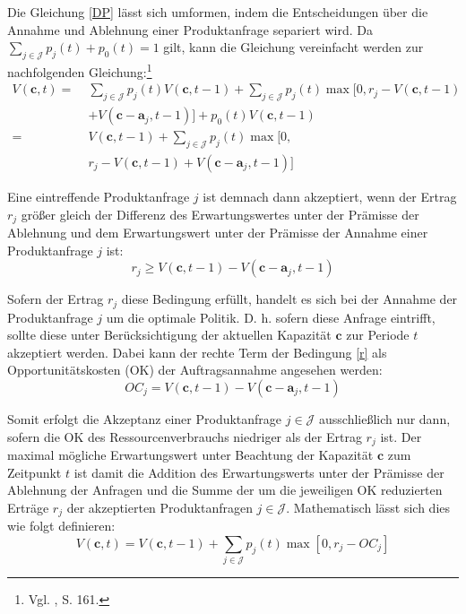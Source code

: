 Die Gleichung \eqref{DP} lässt sich umformen, indem die Entscheidungen über die Annahme und Ablehnung einer Produktanfrage separiert wird. Da $\sum_{j\in \mathcal{J}}p_{j}(t)+p_{0}(t)=1$ gilt, kann die Gleichung vereinfacht werden zur nachfolgenden Gleichung:\footnote{Vgl. \cite{Spengler:2007aa}, S. 161.}
\begin{equation}\label{DP2}
\begin{alignat*}{2}
V(\textbf{c},t)=\;& \sum_{j\in\mathcal{J}}p_{j}(t) V(\textbf{c},t-1)+ \sum_{j\in\mathcal{J}}p_{j}(t) \max[0,r_{j}-V(\textbf{c},t-1)\\
&+V(\textbf{c}-\textbf{a}_{j},t-1)]+p_{0}(t)V(\textbf{c},t-1)\\
=\;& V(\textbf{c},t-1) + \sum_{j\in\mathcal{J}}p_{j}(t) \max[0,\\
&  r_{j}-V(\textbf{c},t-1)+V(\textbf{c}-\textbf{a}_{j},t-1)]
\end{alignat*}
\end{equation}

Eine eintreffende Produktanfrage $j$ ist demnach dann akzeptiert, wenn der Ertrag $r_{j}$ größer gleich der Differenz des Erwartungswertes unter der Prämisse der Ablehnung und dem Erwartungswert unter der Prämisse der Annahme einer Produktanfrage $j$ ist:
\begin{equation}\label{r}
r_{j} \ge V(\textbf{c},t-1)-V(\textbf{c}-\textbf{a}_{j},t-1)
\end{equation}

Sofern der Ertrag $r_j$ diese Bedingung erfüllt, handelt es sich bei der Annahme der Produktanfrage $j$ um die optimale Politik. D. h. sofern diese Anfrage eintrifft, sollte diese unter Berücksichtigung der aktuellen Kapazität $\textbf{c}$ zur Periode $t$ akzeptiert werden. Dabei kann der rechte Term der Bedingung \eqref{r} als Opportunitätskosten (OK) der Auftragsannahme angesehen werden:
\begin{equation}\label{OC}
OC_{j} = V(\textbf{c},t-1)-V(\textbf{c}-\textbf{a}_{j},t-1)
\end{equation}

Somit erfolgt die Akzeptanz einer Produktanfrage $j\in\mathcal{J}$ ausschließlich nur dann, sofern die OK des Ressourcenverbrauchs niedriger als der Ertrag $r_j$ ist. Der maximal mögliche Erwartungswert unter Beachtung der Kapazität $\textbf{c}$ zum Zeitpunkt $t$ ist damit die Addition des Erwartungswerts unter der Prämisse der Ablehnung der Anfragen und die Summe der um die jeweiligen OK reduzierten Erträge $r_j$ der akzeptierten Produktanfragen $j\in\mathcal{J}$. Mathematisch lässt sich dies wie folgt definieren:
\begin{equation}\label{DPoc}
V(\textbf{c},t)=V(\textbf{c},t-1) + \sum_{j\in\mathcal{J}}p_{j}(t) \max[0,r_{j}-OC_{j}]
\end{equation}

